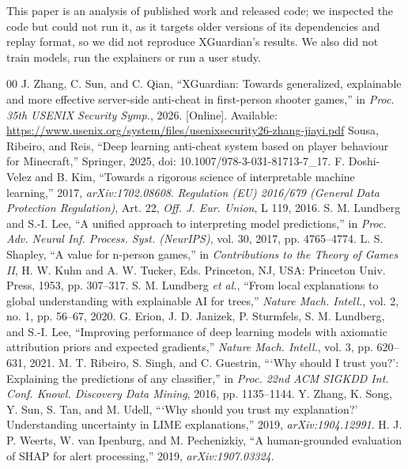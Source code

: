 \documentclass[conference]{IEEEtran}
\begin{document}
This paper is an analysis of published work and released code; we inspected the code but could not run it, as it targets older versions of its dependencies and replay format, so we did not reproduce XGuardian's results. We also did not train models, run the explainers or run a user study.\clearpage
\begin{thebibliography}{00}
 J. Zhang, C. Sun, and C. Qian, ``XGuardian: Towards generalized, explainable and more effective server-side anti-cheat in first-person shooter games,'' in \textit{Proc. 35th USENIX Security Symp.}, 2026. [Online]. Available: \url{https://www.usenix.org/system/files/usenixsecurity26-zhang-jiayi.pdf}
 Sousa, Ribeiro, and Reis, ``Deep learning anti-cheat system based on player behaviour for Minecraft,'' Springer, 2025, doi: 10.1007/978-3-031-81713-7\_17.
 F. Doshi-Velez and B. Kim, ``Towards a rigorous science of interpretable machine learning,'' 2017, \textit{arXiv:1702.08608}.
 \textit{Regulation (EU) 2016/679 (General Data Protection Regulation)}, Art. 22, \textit{Off. J. Eur. Union}, L 119, 2016.
 S. M. Lundberg and S.-I. Lee, ``A unified approach to interpreting model predictions,'' in \textit{Proc. Adv. Neural Inf. Process. Syst. (NeurIPS)}, vol. 30, 2017, pp. 4765--4774.
 L. S. Shapley, ``A value for n-person games,'' in \textit{Contributions to the Theory of Games II}, H. W. Kuhn and A. W. Tucker, Eds. Princeton, NJ, USA: Princeton Univ. Press, 1953, pp. 307--317.
 S. M. Lundberg \textit{et al.}, ``From local explanations to global understanding with explainable AI for trees,'' \textit{Nature Mach. Intell.}, vol. 2, no. 1, pp. 56--67, 2020.
 G. Erion, J. D. Janizek, P. Sturmfels, S. M. Lundberg, and S.-I. Lee, ``Improving performance of deep learning models with axiomatic attribution priors and expected gradients,'' \textit{Nature Mach. Intell.}, vol. 3, pp. 620--631, 2021.
 M. T. Ribeiro, S. Singh, and C. Guestrin, ```Why should I trust you?': Explaining the predictions of any classifier,'' in \textit{Proc. 22nd ACM SIGKDD Int. Conf. Knowl. Discovery Data Mining}, 2016, pp. 1135--1144.
 Y. Zhang, K. Song, Y. Sun, S. Tan, and M. Udell, ```Why should you trust my explanation?' Understanding uncertainty in LIME explanations,'' 2019, \textit{arXiv:1904.12991}.
 H. J. P. Weerts, W. van Ipenburg, and M. Pechenizkiy, ``A human-grounded evaluation of SHAP for alert processing,'' 2019, \textit{arXiv:1907.03324}.

\end{thebibliography}
\end{document}
